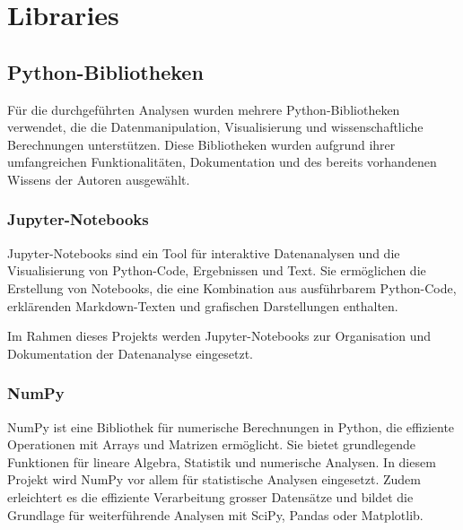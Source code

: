 

\chapter{Libraries} %

\label{AppendixA} %


\section{Python-Bibliotheken}
Für die durchgeführten Analysen wurden mehrere Python-Bibliotheken verwendet, die die Datenmanipulation, Visualisierung und wissenschaftliche Berechnungen unterstützen. Diese Bibliotheken wurden aufgrund ihrer umfangreichen Funktionalitäten, Dokumentation und des bereits vorhandenen Wissens der Autoren ausgewählt. 


\subsection{Jupyter-Notebooks}  
Jupyter-Notebooks sind ein Tool für interaktive Datenanalysen und die Visualisierung von Python-Code, Ergebnissen und Text. Sie ermöglichen die Erstellung von Notebooks, die eine Kombination aus ausführbarem Python-Code, erklärenden \linebreak Markdown-Texten und grafischen Darstellungen enthalten. \parencite{noauthor_project_nodate} 

Im Rahmen dieses Projekts werden Jupyter-Notebooks zur Organisation und Dokumentation der Datenanalyse eingesetzt. 

\subsection{NumPy}
NumPy ist eine Bibliothek für numerische Berechnungen in Python, die effiziente Operationen mit Arrays und Matrizen ermöglicht. Sie bietet grundlegende Funktionen für lineare Algebra, Statistik und numerische Analysen. In diesem Projekt wird NumPy vor allem für statistische Analysen eingesetzt. Zudem erleichtert es die effiziente Verarbeitung grosser Datensätze und bildet die Grundlage für weiterführende Analysen mit SciPy, Pandas oder Matplotlib. \parencite{noauthor_numpy_nodate}\parencite{noauthor_what_nodate}


